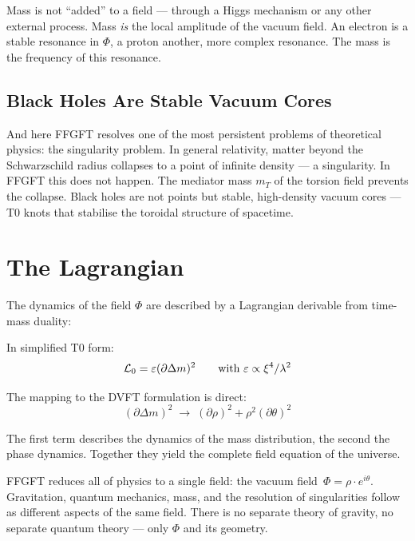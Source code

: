 Mass is not ``added'' to a field --- through a Higgs mechanism or any other external process. Mass \emph{is} the local amplitude of the vacuum field. An electron is a stable resonance in $\Phi$, a proton another, more complex resonance. The mass is the frequency of this resonance.

\subsection{Black Holes Are Stable Vacuum Cores}

And here FFGFT resolves one of the most persistent problems of theoretical physics: the singularity problem. In general relativity, matter beyond the Schwarzschild radius collapses to a point of infinite density --- a singularity. In FFGFT this does not happen. The mediator mass $m_T$ of the torsion field prevents the collapse. Black holes are not points but stable, high-density vacuum cores --- T0 knots that stabilise the toroidal structure of spacetime.

\section{The Lagrangian}

The dynamics of the field $\Phi$ are described by a Lagrangian derivable from time-mass duality:

In simplified T0 form:
\begin{equation}
\mathcal{L}_0 = \varepsilon (\partial \Delta m)^2 \qquad \text{with } \varepsilon \propto \xi^4/\lambda^2
\end{equation}

The mapping to the DVFT formulation is direct:
\begin{equation}
(\partial \Delta m)^2 \;\longrightarrow\; (\partial \rho)^2 + \rho^2 (\partial \theta)^2
\end{equation}

The first term describes the dynamics of the mass distribution, the second the phase dynamics. Together they yield the complete field equation of the universe.

\begin{zusammenfassung}
FFGFT reduces all of physics to a single field: the vacuum field~$\Phi = \rho \cdot e^{i\theta}$. Gravitation, quantum mechanics, mass, and the resolution of singularities follow as different aspects of the same field. There is no separate theory of gravity, no separate quantum theory --- only $\Phi$ and its geometry.
\end{zusammenfassung}
